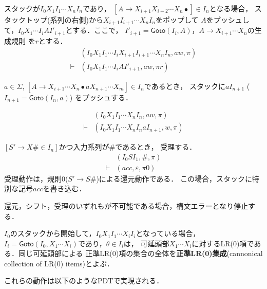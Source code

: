 \documentclass[a4j,dvipdfmx]{jbook}
\begin{document}
\begin{list}{}{}
  \item [{\bf 還元}]
  スタックが$I_0X_1I_1\cdots X_{n}I_n$であり，
$[A\rightarrow X_{i+1}X_{i+2}\cdots X_n\bullet]\in I_n$となる場合，
スタックトップ(系列の右側)から$X_{i+1}I_{i+1}\cdots X_nI_n$をポップして
$A$をプッシュして，$I_0X_1\cdots I_iAI'_{i+1}$とする．ここで，
$I'_{i+1}=\mathsf{Goto}(I_i,A)$，$A\rightarrow X_{i+1}\cdots X_n$の生成規則
を$r$とする．
\[\begin{array}{cl}
  & (I_0X_1I_1\cdots I_iX_{i+1}I_{i+1}\cdots X_nI_n,aw,\pi)\\
  \vdash & (I_0X_1I_1\cdots I_iAI'_{i+1},aw,\pi r)
\end{array}\]

  \item [{\bf シフト}]
  $a\in\Sigma$,
  $[A\rightarrow X_{i+1}\cdots X_n\bullet a X_{n+1}\cdots X_m]\in I_n$であるとき，
  スタックに$a I_{n+1}$ ($I_{n+1}=\mathsf{Goto}(I_n,a)$) をプッシュする．

  \[\begin{array}{cl}
      & (I_0X_1I_1\cdots X_nI_n,aw,\pi)\\
  \vdash & (I_0X_1I_1\cdots X_nI_n a I_{n+1},w,\pi)
  \end{array}
  \]
  \item [{\bf 受理}]
  $[S'\rightarrow X\texttt{\#}\in I_n]$かつ入力系列が$\texttt{\#}$であるとき，
  受理する．
  \[\begin{array}{cl}
    & (I_0SI_1,\texttt{\#},\pi)\\
  \vdash & (acc,\varepsilon,\pi 0)
  \end{array}\]
  受理動作は，規則0($S'\rightarrow S\texttt{\#}$)による還元動作である．
  この場合，スタックに特別な記号$acc$を書き込む．
  \item [{\bf エラー}]
  還元，シフト，受理のいずれもが不可能である場合，構文エラーとなり停止する．
\end{list}

$I_0$のスタックから開始して，$I_0X_1I_1\cdots X_iI_i$となっている場合，
$I_i=\mathsf{Goto}(I_0,X_1\cdots X_i)$であり，$\theta\in I_i$は，
可延頭部$X_1\cdots X_i$に対するLR(0)項である．同じ可延頭部による
正準LR(0)項の集合の全体を{\bf 正準LR(0)集成}(cannonical collection of
LR(0) items)とよぶ．

これらの動作は以下のようなPDTで実現される．
\end{document}
